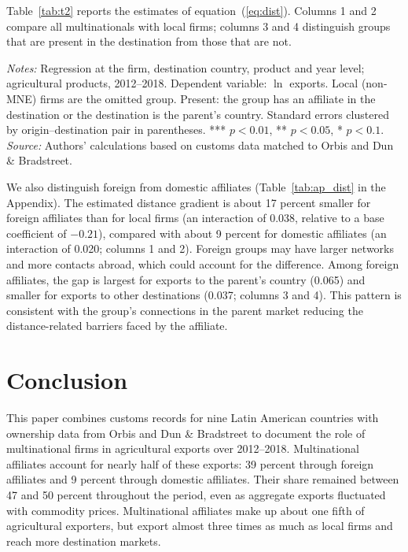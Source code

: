 \documentclass[11pt,a4paper]{article}
\newcommand{\srcnote}{\textit{Source:} Authors' calculations based on customs data matched to Orbis and Dun \& Bradstreet.}
\begin{document}
Table~\ref{tab:t2} reports the estimates of equation~(\ref{eq:dist}). Columns 1 and 2 compare all
multinationals with local firms; columns 3 and 4 distinguish groups that are present in the
destination from those that are not.
\begin{table}[H]\centering\small%
  \caption{Distance and Firm Agricultural Exports: Multinationals by Presence at the Destination}%
  \label{tab:t2}%
  \par\vspace{3pt}%
  \begin{minipage}{0.95\textwidth}\footnotesize %
  \textit{Notes:} Regression at the firm, destination country, product and year level; agricultural products, 2012--2018. Dependent variable: $\ln$ exports. Local (non-MNE) firms are the omitted group. Present: the group has an affiliate in the destination or the destination is the parent's country. Standard errors clustered by origin--destination pair in parentheses. *** $p<0.01$, ** $p<0.05$, * $p<0.1$.\\[3pt]%
  \srcnote%
  \end{minipage}%
  \end{table}
We also distinguish foreign from domestic affiliates (Table~\ref{tab:ap_dist} in the Appendix).
The estimated distance gradient is about 17 percent smaller for foreign affiliates than for local
firms (an interaction of 0.038, relative to a base coefficient of $-0.21$), compared with about 9
percent for domestic affiliates (an interaction of 0.020; columns 1 and 2). Foreign groups may have
larger networks and more contacts abroad, which could account for the difference. Among foreign
affiliates, the gap is largest for exports to the parent's country (0.065) and smaller for exports
to other destinations (0.037; columns 3 and 4). This pattern is consistent with the group's
connections in the parent market reducing the distance-related barriers faced by the affiliate.

\section{Conclusion}\label{sec:concl}
This paper combines customs records for nine Latin American countries with ownership data from
Orbis and Dun \& Bradstreet to document the role of multinational firms in agricultural exports
over 2012--2018. Multinational affiliates account for nearly half of these exports: 39 percent
through foreign affiliates and 9 percent through domestic affiliates. Their share remained between
47 and 50 percent throughout the period, even as aggregate exports fluctuated with commodity
prices. Multinational affiliates make up about one fifth of agricultural exporters, but export
almost three times as much as local firms and reach more destination markets.
\end{document}
